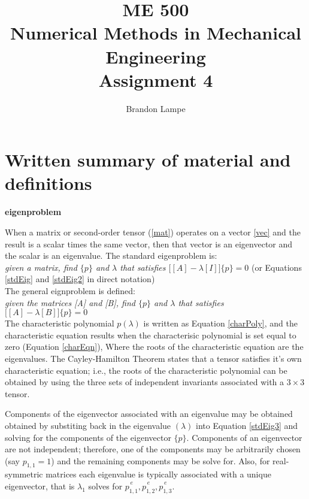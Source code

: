 \documentclass[letterpaper, 10pt, oneside]{article}
\title{ME 500\\ Numerical Methods in Mechanical Engineering\\ Assignment 4}
\author{Brandon Lampe}
\newenvironment{dd}[1]{
	\noindent
	\textbf{\normalsize{#1}}
	\hspace{0.1in}
	\small
	\rmfamily
	}
	{\medskip}
\begin{document}
\maketitle
\section{Written summary of material and definitions}

\begin{dd}{eigenproblem}
When a matrix or second-order tensor (\ref{mat}) operates on a vector \ref{vec} and the result is a scalar times the same vector, then that vector is an eigenvector and the scalar is an eigenvalue.  The standard eigenproblem is: \\

\emph{given a matrix, find $\{p\}$ and $\lambda$ that satisfies $\big[ [A] - \lambda [I] \big]\{p\} = 0$}  (or Equations \ref{stdEig} and \ref{stdEig2} in direct notation)\\

The general eignproblem is defined: \\
\emph{given the matrices [A] and [B], find $\{p\}$ and $\lambda$ that satisfies $\big[ [A] - \lambda [B] \big]\{p\} = 0$}\\


The characteristic polynomial $p(\lambda)$ is written as Equation \ref{charPoly}, and the characteristic equation results when the characterisic polynomial is set equal to zero (Equation \ref{charEqn}), Where the roots of the characteristic equation are the eigenvalues. The Cayley-Hamilton Theorem states that a tensor satisfies it's own characteristic equation; i.e., the roots of the characteristic polynomial can be obtained by using the three sets of independent invariants associated with a $3\times 3$ tensor.

Components of the eigenvector associated with an eigenvalue may be obtained obtained by substiting back in the eigenvalue $(\lambda)$ into Equation \ref{stdEig3} and solving for the components of the eigenvector $\{p\}$. Components of an eigenvector are not independent; therefore, one of the components may be arbitrarily chosen (say $p_{1,1} = 1$) and the remaining components may be solve for.  Also, for real-symmetric matrices each eigenvalue is typically associated with a unique eigenvector, that is $\lambda_1$ solves for $\overset{e}{p_{1,1}}, \overset{e}{p_{1,2}}, \overset{e}{p_{1,3}}$.


\end{dd}
\end{document}
